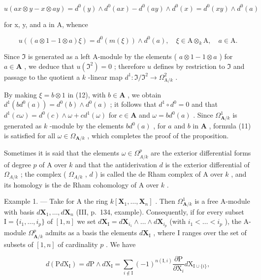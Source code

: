 \[
u (a x \otimes y - x \otimes a y) = d ^ {0} (y) \wedge d ^ {0} (a x) - d ^ {0} (a y) \wedge d ^ {0} (x) = d ^ {0} (x y) \wedge d ^ {0} (a)
\]

for x, y, and a in A, whence

\[
u ((a \otimes 1 - 1 \otimes a) \xi) = d ^ {0} (m (\xi)) \wedge d ^ {0} (a), \quad \xi \in \mathrm{A} \otimes_ {k} \mathrm{A}, \quad a \in \mathrm{A}. \tag {12}
\]

Since \(\mathfrak{I}\) is generated as a left A-module by the elements ( \(a \otimes 1 - 1 \otimes a\) ) for \(a \in \mathbf{A}\) , we deduce that \(u(\mathfrak{I}^2) = 0\) ; therefore \(u\) defines by restriction to \(\mathfrak{I}\) and passage to the quotient a \(k\) -linear map \(d^1: \mathfrak{I}/\mathfrak{I}^2 \to \Omega_{\mathrm{A}/k}^2\) .

By making \(\xi = b \otimes 1\) in (12), with \(b \in \mathbf{A}\) , we obtain \(d^{1}(bd^{0}(a)) = d^{0}(b) \wedge d^{0}(a)\) ; it follows that \(d^{1} \circ d^{0} = 0\) and that \(d^{1}(c\omega) = d^{0}(c) \wedge \omega + cd^{1}(\omega)\) for \(c \in \mathbf{A}\) and \(\omega = bd^{0}(a)\) . Since \(\Omega_{\mathbf{A}/k}^{1}\) is generated as \(k\) -module by the elements \(bd^{0}(a)\) , for \(a\) and \(b\) in \(\mathbf{A}\) , formula (11) is satisfied for all \(\omega \in \Omega_{\mathbf{A}/k}\) , which completes the proof of the proposition.

Sometimes it is said that the elements \(\omega\in\Omega_{A/k}^{p}\) are the exterior differential forms of degree \(p\) of A over \(k\) and that the antiderivation \(d\) is the exterior differential of \(\Omega_{A/k}\) ; the complex ( \(\Omega_{A/k}\) , \(d\) ) is called the de Rham complex of A over \(k\) , and its homology is the de Rham cohomology of A over \(k\) .

Example 1. --- Take for A the ring \(k[\mathbf{X}_{1},\ldots,\mathbf{X}_{n}]\) . Then \(\Omega_{\mathbf{A}/k}^{1}\) is a free A-module with basis \(d\mathbf{X}_{1},\ldots,d\mathbf{X}_{n}\) (III, p.~134, example). Consequently, if for every subset \(\mathrm{I}=\{i_{1},\ldots,i_{p}\}\) of \([1,n]\) we set \(d\mathbf{X}_{\mathrm{I}}=d\mathbf{X}_{i_{1}}\wedge\ldots\wedge d\mathbf{X}_{i_{p}}\) (with \(i_{1}<\ldots<i_{p}\) ), the A-module \(\Omega_{\mathbf{A}/k}^{p}\) admits as a basis the elements \(d\mathbf{X}_{\mathrm{I}}\) , where I ranges over the set of subsets of \([1,n]\) of cardinality \(p\) . We have

\[
d (\mathrm{P} d \mathrm{X} _ {\mathrm{I}}) = d \mathrm{P} \wedge d \mathrm{X} _ {\mathrm{I}} = \sum_ {i \notin \mathrm{I}} (- 1) ^ {n (\mathrm{I}, i)} \frac {\partial \mathrm{P}}{\partial \mathrm{X} _ {i}} d \mathrm{X} _ {\mathrm{I} \cup \{i \}},
\]

